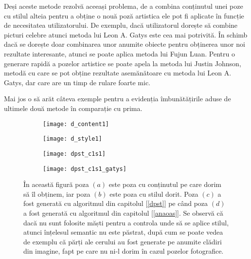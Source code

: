 Deși aceste metode rezolvă aceeași problema, de a combina conținutul unei poze cu stilul alteia pentru a obține o nouă poză artistica ele pot fi aplicate în funcție de necesitatea utilizatorului. De exemplu, dacă utilizatorul dorește să combine picturi celebre atunci metoda lui Leon A. Gatys este cea mai potrivită. În schimb dacă se dorește doar combinarea unor anumite obiecte pentru obținerea unor noi rezultate interesante, atunci se poate aplica metoda lui Fujun Luan. Pentru o generare rapidă a pozelor artistice se poate apela la metoda lui Justin Johnson, metodă cu care se pot obține rezultate asemănătoare cu metoda lui Leon A. Gatys, dar care are un timp de rulare foarte mic.

Mai jos o să arăt câteva exemple pentru a evidenția îmbunătățirile aduse de ultimele două metode în comparație cu prima.

\begin{figure}[h]
	\centering
    \begin{subfigure}[b]{0.24\textwidth}
		\centering
        \texttt{[image: d\_content1]}
        \label{fig:dpst_d_content1}
        \caption{}
	\end{subfigure}
    \hfill
    \begin{subfigure}[b]{0.24\textwidth}
		\centering
        \texttt{[image: d\_style1]}
        \label{fig:dpst_d_style1}
        \caption{}
	\end{subfigure}
    \hfill
    \begin{subfigure}[b]{0.24\textwidth}
		\centering
        \texttt{[image: dpst\_c1s1]}
        \label{fig:dpst_c1s1}
        \caption{}
	\end{subfigure}
    \hfill
    \begin{subfigure}[b]{0.24\textwidth}
		\centering
        \texttt{[image: dpst\_c1s1\_gatys]}
        \label{fig:dpst_c1s1_gatys}
        \caption{}
	\end{subfigure}
    \caption{În această figură poza $(a)$ este poza cu conținutul pe care dorim să îl obținem, iar poza $(b)$ este poza cu stilul dorit. Poza $(c)$ a fost generată cu algoritmul din capitolul [\ref{dpst}] pe când poza $(d)$ a fost generată cu algoritmul din capitolul [\ref{anaoas}]. Se observă că dacă nu sunt folosite măști pentru a controla unde să se aplice stilul, atunci înțelesul semantic nu este păstrat, după cum se poate vedea de exemplu că părți ale cerului au fost generate pe anumite clădiri din imagine, fapt pe care nu ni-l dorim în cazul pozelor fotografice.}
\end{figure}

